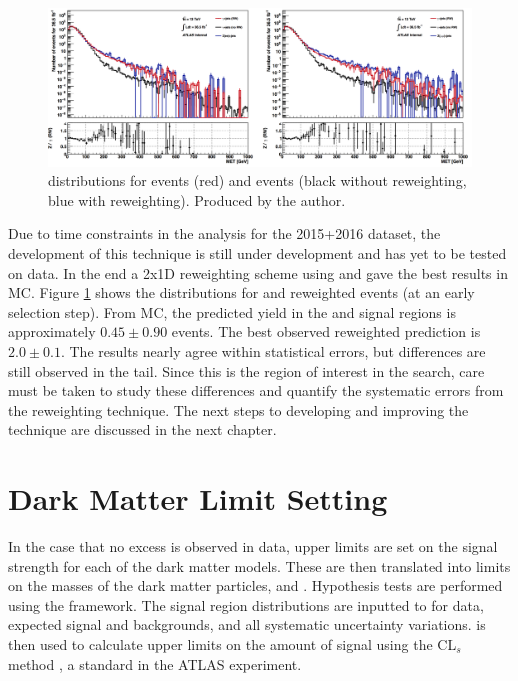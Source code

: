 \begin{figure}[h]
\centering
\includegraphics[width=1\textwidth]{Figures/gjets.png}
\caption{\etmiss distributions for \gjets events (red) and \Zjets events (black without reweighting, blue with reweighting). Produced by the author.}
\label{fig:gjets}
\end{figure}

Due to time constraints in the analysis for the 2015+2016 dataset, the development of this technique is still under development and has yet to be tested on data. In the end a 2x1D reweighting scheme using \pt and \etmissht gave the best results in MC. Figure \ref{fig:gjets} shows the \etmiss distributions for \Zjets and reweighted \gjets events (at an early selection step). From \Zjets MC, the predicted yield in the \ee and \mm signal regions is approximately $0.45 \pm 0.90$ events. The best observed reweighted \gjets prediction is $2.0 \pm 0.1$. The results nearly agree within statistical errors, but differences are still observed in the \etmiss tail. Since this is the region of interest in the \monoZ search, care must be taken to study these differences and quantify the systematic errors from the reweighting technique. The next steps to developing and improving the \gjets technique are discussed in the next chapter.

\section{Dark Matter Limit Setting}
\label{sec:limits}

In the case that no excess is observed in data, upper limits are set on the signal strength for each of the dark matter models. These are then translated into limits on the masses of the dark matter particles, \mchi and \mmed. Hypothesis tests are performed using the \histfitter \cite{Baak:2014wma} framework. The signal region \etmiss distributions are inputted to \histfitter for data, expected signal and backgrounds, and all systematic uncertainty variations. \histfitter is then used to calculate upper limits on the amount of signal using the CL$_{s}$ method \cite{Cowan:2010js}, a standard in the ATLAS experiment. 

